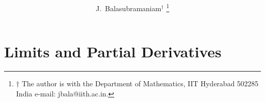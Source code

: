 \documentclass[journal,12pt,twocolumn]{IEEEtran}
\begin{document}
\providecommand{\nCr}[2]{\,^{#1}C_{#2}} %
\providecommand{\nPr}[2]{\,^{#1}P_{#2}} %
\providecommand{\mbf}{\mathbf}
\providecommand{\pr}[1]{\ensuremath{\Pr\left(#1\right)}}
\providecommand{\qfunc}[1]{\ensuremath{Q\left(#1\right)}}
\providecommand{\sbrak}[1]{\ensuremath{{}\left[#1\right]}}
\providecommand{\lsbrak}[1]{\ensuremath{{}\left[#1\right.}}
\providecommand{\rsbrak}[1]{\ensuremath{{}\left.#1\right]}}
\providecommand{\brak}[1]{\ensuremath{\left(#1\right)}}
\providecommand{\lbrak}[1]{\ensuremath{\left(#1\right.}}
\providecommand{\rbrak}[1]{\ensuremath{\left.#1\right)}}
\providecommand{\cbrak}[1]{\ensuremath{\left\{#1\right\}}}
\providecommand{\lcbrak}[1]{\ensuremath{\left\{#1\right.}}
\providecommand{\rcbrak}[1]{\ensuremath{\left.#1\right\}}}
\newcommand{\sgn}{\mathop{\mathrm{sgn}}}
\providecommand{\abs}[1]{\left\vert#1\right\vert}
\providecommand{\res}[1]{\Res\displaylimits_{#1}} 
\providecommand{\norm}[1]{\lVert#1\rVert}
\providecommand{\mtx}[1]{\mathbf{#1}}
\providecommand{\mean}[1]{E\left[ #1 \right]}
\providecommand{\fourier}{\overset{\mathcal{F}}{ \rightleftharpoons}}
\providecommand{\system}{\overset{\mathcal{H}}{ \longleftrightarrow}}

\newcommand{\solution}{\noindent \textbf{Solution: }}
\providecommand{\dec}[2]{\ensuremath{\overset{#1}{\underset{#2}{\gtrless}}}}
\title{ 
}
\author{J.~Balasubramaniam$^{\dagger}$ %
\thanks{$\dagger$ The author is with the Department of Mathematics, IIT Hyderabad
502285 India e-mail: jbala@iith.ac.in. }
}
\maketitle


\section{Limits and Partial Derivatives}
\end{document}

